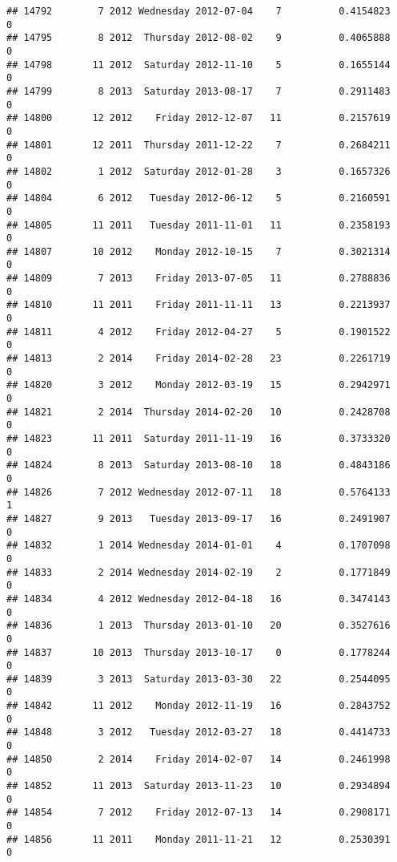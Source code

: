 \documentclass[
]{article}
\begin{document}
\begin{verbatim}
## 14792        7 2012 Wednesday 2012-07-04    7          0.4154823             0
## 14795        8 2012  Thursday 2012-08-02    9          0.4065888             0
## 14798       11 2012  Saturday 2012-11-10    5          0.1655144             0
## 14799        8 2013  Saturday 2013-08-17    7          0.2911483             0
## 14800       12 2012    Friday 2012-12-07   11          0.2157619             0
## 14801       12 2011  Thursday 2011-12-22    7          0.2684211             0
## 14802        1 2012  Saturday 2012-01-28    3          0.1657326             0
## 14804        6 2012   Tuesday 2012-06-12    5          0.2160591             0
## 14805       11 2011   Tuesday 2011-11-01   11          0.2358193             0
## 14807       10 2012    Monday 2012-10-15    7          0.3021314             0
## 14809        7 2013    Friday 2013-07-05   11          0.2788836             0
## 14810       11 2011    Friday 2011-11-11   13          0.2213937             0
## 14811        4 2012    Friday 2012-04-27    5          0.1901522             0
## 14813        2 2014    Friday 2014-02-28   23          0.2261719             0
## 14820        3 2012    Monday 2012-03-19   15          0.2942971             0
## 14821        2 2014  Thursday 2014-02-20   10          0.2428708             0
## 14823       11 2011  Saturday 2011-11-19   16          0.3733320             0
## 14824        8 2013  Saturday 2013-08-10   18          0.4843186             0
## 14826        7 2012 Wednesday 2012-07-11   18          0.5764133             1
## 14827        9 2013   Tuesday 2013-09-17   16          0.2491907             0
## 14832        1 2014 Wednesday 2014-01-01    4          0.1707098             0
## 14833        2 2014 Wednesday 2014-02-19    2          0.1771849             0
## 14834        4 2012 Wednesday 2012-04-18   16          0.3474143             0
## 14836        1 2013  Thursday 2013-01-10   20          0.3527616             0
## 14837       10 2013  Thursday 2013-10-17    0          0.1778244             0
## 14839        3 2013  Saturday 2013-03-30   22          0.2544095             0
## 14842       11 2012    Monday 2012-11-19   16          0.2843752             0
## 14848        3 2012   Tuesday 2012-03-27   18          0.4414733             0
## 14850        2 2014    Friday 2014-02-07   14          0.2461998             0
## 14852       11 2013  Saturday 2013-11-23   10          0.2934894             0
## 14854        7 2012    Friday 2012-07-13   14          0.2908171             0
## 14856       11 2011    Monday 2011-11-21   12          0.2530391             0

\end{verbatim}
\end{document}
